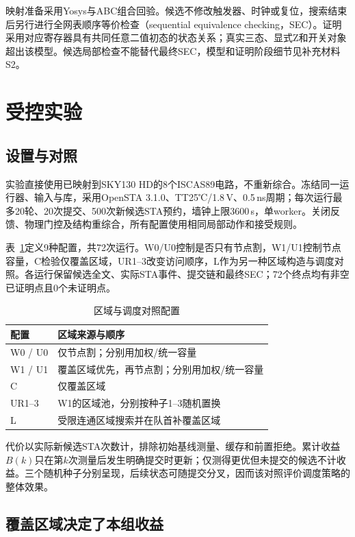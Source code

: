 \documentclass[twocolumn,10pt,fontset=windows]{ctexart}
\begin{document}
映射准备采用Yosys与ABC\cite{abc}组合回验。候选不修改触发器、时钟或复位，搜索结束后另行进行全网表顺序等价检查（sequential equivalence checking，SEC）。证明采用对应寄存器具有共同任意二值初态的状态关系；真实三态、显式Z和开关对象超出该模型。候选局部检查不能替代最终SEC，模型和证明阶段细节见补充材料S2。

\section{受控实验}

\subsection{设置与对照}\label{sec:controlled}

实验直接使用已映射到SKY130 HD的8个ISCAS89电路\cite{iscas89}，不重新综合。冻结同一运行器、输入与库，采用OpenSTA 3.1.0、TT25℃/1.8\,V、0.5\,ns周期；每次运行最多20轮、20次提交、500次新候选STA预约，墙钟上限3600\,s，单worker。关闭反馈、物理门控及结构重综合，所有配置使用相同局部动作和接受规则。

表~\ref{tab:arms}定义9种配置，共72次运行。W0/U0控制是否只有节点割，W1/U1控制节点容量，C检验仅覆盖区域，UR1--3改变访问顺序，L作为另一种区域构造与调度对照。各运行保留候选全文、实际STA事件、提交链和最终SEC；72个终点均有非空已证明点且0个未证明点。

\begin{table}[htbp]
\centering
\caption{区域与调度对照配置}\label{tab:arms}
\footnotesize
\setlength{\tabcolsep}{3pt}
\begin{tabular}{p{1.6cm}p{5.9cm}}
\toprule
配置 & 区域来源与顺序 \\
\midrule
W0 / U0 & 仅节点割；分别用加权/统一容量 \\
W1 / U1 & 覆盖区域优先，再节点割；分别用加权/统一容量 \\
C & 仅覆盖区域 \\
UR1--3 & W1的区域池，分别按种子1--3随机置换 \\
L & 受限连通区域搜索并在队首补覆盖区域 \\
\bottomrule
\end{tabular}
\end{table}

代价以实际新候选STA次数计，排除初始基线测量、缓存和前置拒绝。累计收益$B(k)$只在第$k$次测量后发生明确提交时更新；仅测得更优但未提交的候选不计收益。三个随机种子分别呈现，后续状态可随提交分叉，因而该对照评价调度策略的整体效果。

\subsection{覆盖区域决定了本组收益}\label{sec:gain}
\end{document}

